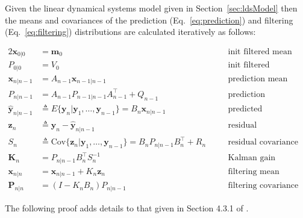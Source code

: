 \begin{theorem}
	\label{thm:kalmanFilterEqs}

    Given the linear dynamical systems model given in
    Section~\ref{sec:ldsModel} then the means and covariances of the prediction
    (Eq.~\ref{eq:prediction}) and filtering (Eq.~\ref{eq:filtering})
    distributions are calculated iteratively as follows:

    \begin{alignat}{2}
        \mathbf{x}_{0|0}&=\mathbf{m}_0&&\text{init filtered mean}\label{eq:x0G0}\\
        P_{0|0}&=V_0&&\text{init filtered covariance}\label{eq:P0G0}\\
        \mathbf{x}_{n|n-1}&=A_{n-1}\mathbf{x}_{n-1|n-1}&&\text{prediction mean}\label{eq:xtGtm1}\\
        P_{n|n-1}&=A_{n-1}P_{n-1|n-1}A_{n-1}^\intercal+Q_{n-1}&&\text{prediction covariance}\label{eq:PtGtm1}\\
        \hat{\mathbf{y}}_{n|n-1}&\triangleq E\{\mathbf{y}_n|\mathbf{y}_1,\ldots,\mathbf{y}_{n-1}\}=B_n\mathbf{x}_{n|n-1}&&\text{predicted observation}\label{eq:ytGtm1}\\
        \mathbf{z}_n&\triangleq\mathbf{y}_n-\hat{\mathbf{y}}_{n|n-1}&&\text{residual}\nonumber\\
        S_n&\triangleq \text{Cov}\{\mathbf{z}_n|\mathbf{y}_1,\ldots,\mathbf{y}_{n-1}\}=B_nP_{n|n-1}B_n^\intercal+R_n\quad&&\text{residual covariance}\label{eq:St}\\
        \mathbf{K}_n&=P_{n|n-1}B_n^\intercal S_n^{-1}&&\text{Kalman gain}\label{eq:Kt}\\
        \mathbf{x}_{n|n}&=\mathbf{x}_{n|n-1}+K_n\mathbf{z}_n&&\text{filtering mean}\label{eq:xtGt}\\
        \mathbf{P}_{n|n}&=(I-K_nB_n)P_{n|n-1}&&\text{filtering covariance}\label{eq:PtGt}
    \end{alignat}

\end{theorem}

The following proof adds details to that given in Section 4.3.1 of
\citet{durbinAndKoopman12}.

